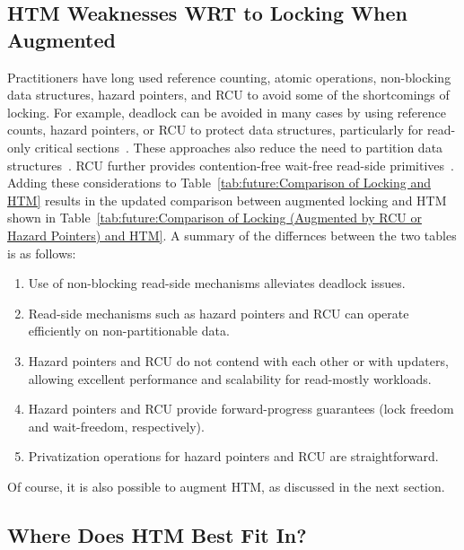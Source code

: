 \subsection{HTM Weaknesses WRT to Locking When Augmented}
\label{sec:future:HTM Weaknesses WRT to Locking When Augmented}



Practitioners have long used reference counting, atomic operations,
non-blocking data structures, hazard pointers, and RCU to avoid some
of the shortcomings of locking.
For example, deadlock can be avoided in many cases by using reference
counts, hazard pointers, or RCU to protect data structures,
particularly for read-only critical
sections~\cite{MagedMichael04a,HerlihyLM02,MathieuDesnoyers2012URCU,DinakarGuniguntala2008IBMSysJ,ThomasEHart2007a}.
These approaches also reduce the need to partition data
structures~\cite{McKenney2008ParallelProgramming}.
RCU further provides contention-free wait-free read-side
primitives~\cite{MathieuDesnoyers2012URCU}.
Adding these considerations to
Table~\ref{tab:future:Comparison of Locking and HTM}
results in the updated comparison between augmented locking and HTM
shown in
Table~\ref{tab:future:Comparison of Locking (Augmented by RCU or Hazard Pointers) and HTM}.
A summary of the differnces between the two tables is as follows:

\begin{enumerate}
\item	Use of non-blocking read-side mechanisms alleviates deadlock issues.
\item	Read-side mechanisms such as hazard pointers and RCU can operate
	efficiently on non-partitionable data.
\item	Hazard pointers and RCU do not contend with each other or with
	updaters, allowing excellent performance and scalability for
	read-mostly workloads.
\item	Hazard pointers and RCU provide forward-progress guarantees
	(lock freedom and wait-freedom, respectively).
\item	Privatization operations for hazard pointers and RCU are
	straightforward.
\end{enumerate}

Of course, it is also possible to augment HTM,
as discussed in the next section.

\subsection{Where Does HTM Best Fit In?}
\label{sec:future:Where Does HTM Best Fit In?}

